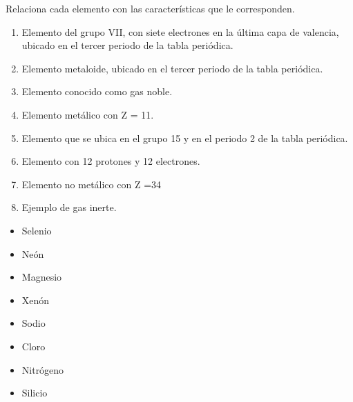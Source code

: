 \documentclass[11pt]{book}
\begin{document}
\begin{boxK}
  Relaciona cada elemento con las características que le corresponden.

  \begin{minipage}{0.6\textwidth}
    \begin{enumerate}\footnotesize
      \item Elemento del grupo VII, con siete electrones en la última capa de valencia, ubicado en el tercer periodo de la tabla periódica.
      \item Elemento metaloide, ubicado en el tercer periodo de la tabla periódica.
      \item Elemento conocido como gas noble.
      \item Elemento metálico con Z = 11.
      \item Elemento que se ubica en el grupo 15 y en el periodo 2 de la tabla periódica.
      \item Elemento con 12 protones y 12 electrones.
      \item Elemento no metálico con Z =34
      \item Ejemplo de gas inerte.
    \end{enumerate}
  \end{minipage}\hfill
  \begin{minipage}{0.25\textwidth}
    \begin{itemize}
      \item[\rule{1cm}{0.2mm}] Selenio
      \item[\rule{1cm}{0.2mm}] Neón
      \item[\rule{1cm}{0.2mm}] Magnesio
      \item[\rule{1cm}{0.2mm}] Xenón
      \item[\rule{1cm}{0.2mm}] Sodio
      \item[\rule{1cm}{0.2mm}] Cloro
      \item[\rule{1cm}{0.2mm}] Nitrógeno
      \item[\rule{1cm}{0.2mm}] Silicio
    \end{itemize}
  \end{minipage}
\end{boxK}
\end{document}
